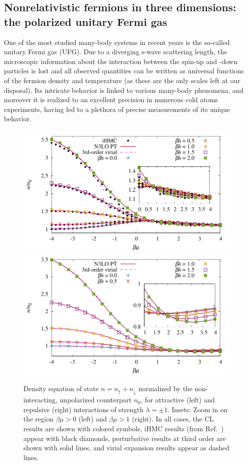 \documentclass[../main.tex]{subfiles}
\begin{document}
\subsection{Nonrelativistic fermions in three dimensions: the polarized unitary Fermi gas}
%
One of the most studied many-body systems in recent years is the so-called unitary Fermi gas (UFG). Due to a diverging s-wave scattering length, the microscopic information about the interaction between
the spin-up and -down particles is lost and all observed quantities can be written as universal functions of the fermion density and temperature (as these are the only scales left at our disposal). Its intricate
behavior is linked to various many-body phenomena, and moreover it is realized to an excellent precision in numerous cold atoms experiments, having led to a plethora of precise measurements of its unique
behavior.
%
\begin{figure}[t]
	\centering
	\includegraphics[width=0.49\columnwidth]{./5applications-NREL/Density_Attractive_L1.pdf}
	\includegraphics[width=0.49\columnwidth]{./5applications-NREL/Density_Repulsive_L1.pdf}
	\caption{\label{fig:DensityLambda1} Density equation of state $n = n_\uparrow + n_\downarrow$ normalized by the non-interacting, unpolarized counterpart $n_0$,
	{for attractive (left) and repulsive (right) interactions of strength $\lambda = \pm 1$.
	Insets: Zoom in on the region $\beta\mu > 0$ (left) and $\beta\mu > 1$ (right).}
	In all cases, the CL results are shown with colored symbols, iHMC results (from Ref.~\cite{PhysRevA.92.063609}) appear with
	black diamonds, perturbative results at third order are shown with solid lines, and virial expansion results
	appear as dashed lines.}
\end{figure}
%
\end{document}
